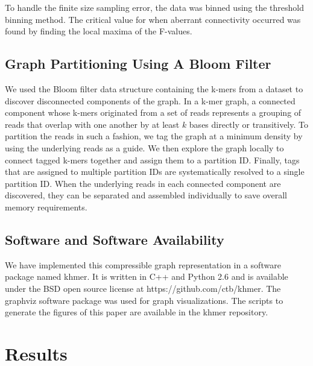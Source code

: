 \documentclass[12pt]{article} \usepackage{simplemargins}
\begin{document}
To handle the finite size sampling error, the data was binned using the 
threshold binning method\cite{adami2002critical}. The critical value for 
when aberrant connectivity occurred was found by finding the local maxima 
of the F-values.

\subsection{Graph Partitioning Using A Bloom Filter}
We used the Bloom filter data structure containing the k-mers from a dataset 
to discover disconnected components of the graph. In a k-mer graph, a connected 
component whose k-mers originated from a set of reads represents a grouping of 
reads that overlap with one another by at least $k$ bases directly or transitively.
To partition the reads in such a fashion, we tag the 
graph at a minimum density by using the underlying reads as a guide. We then
explore the graph locally to connect tagged k-mers together and assign them 
to a partition ID. Finally, tags that are assigned to multiple partition IDs 
are systematically resolved to a single partition ID.  
When the underlying reads in each connected component are discovered, they can be 
separated and assembled individually to save overall memory requirements.

\subsection{Software and Software Availability}
We have implemented this compressible graph representation in a software package
named khmer.
It is written in C++
and Python 2.6 and is available under the BSD open source license at
https://github.com/ctb/khmer.
The graphviz software 
package was used for graph visualizations. The scripts to 
generate the figures of this paper are available in the khmer repository.

\section{Results}
\end{document}
